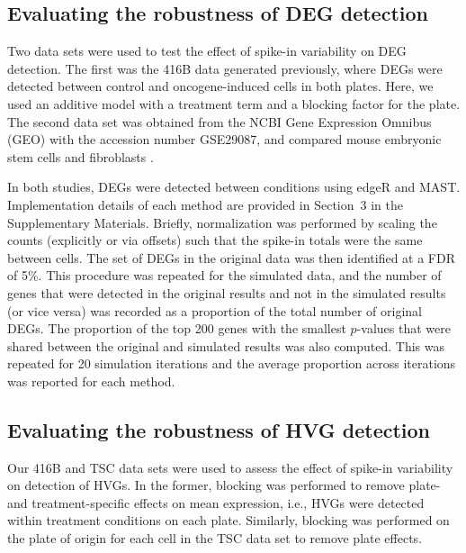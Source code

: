 \documentclass{article}
\newcommand{\suppsecsim}{3}
\begin{document}

\subsection{Evaluating the robustness of DEG detection}
Two data sets were used to test the effect of spike-in variability on DEG detection.
The first was the 416B data generated previously, where DEGs were detected between control and oncogene-induced cells in both plates.
Here, we used an additive model with a treatment term and a blocking factor for the plate.
The second data set was obtained from the NCBI Gene Expression Omnibus (GEO) with the accession number GSE29087, and compared mouse embryonic stem cells and fibroblasts \cite{islam2011characterization}.

In both studies, DEGs were detected between conditions using edgeR and MAST.
Implementation details of each method are provided in Section~\suppsecsim{} in the Supplementary Materials. 
Briefly, normalization was performed by scaling the counts (explicitly or via offsets) such that the spike-in totals were the same between cells.
The set of DEGs in the original data was then identified at a FDR of 5\%.
This procedure was repeated for the simulated data, and the number of genes that were detected in the original results and not in the simulated results (or vice versa) was recorded as a proportion of the total number of original DEGs.
The proportion of the top 200 genes with the smallest $p$-values that were shared between the original and simulated results was also computed.
This was repeated for 20 simulation iterations and the average proportion across iterations was reported for each method.

\subsection{Evaluating the robustness of HVG detection}
Our 416B and TSC data sets were used to assess the effect of spike-in variability on detection of HVGs.
In the former, blocking was performed to remove plate- and treatment-specific effects on mean expression, i.e., HVGs were detected within treatment conditions on each plate.
Similarly, blocking was performed on the plate of origin for each cell in the TSC data set to remove plate effects.
\end{document}

